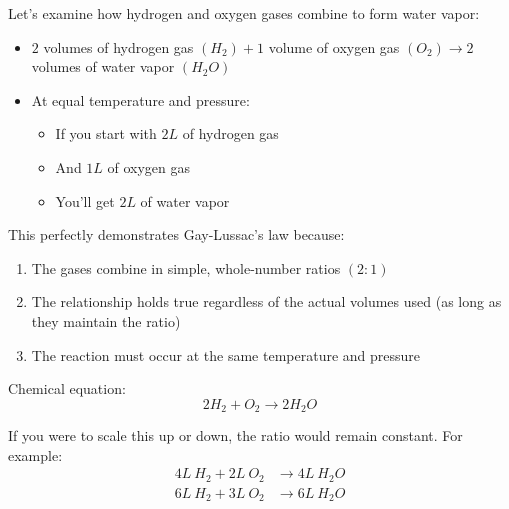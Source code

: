\documentclass[
  a4paper,
]{book}
\providecommand{\tightlist}{%
  \setlength{\itemsep}{0pt}\setlength{\parskip}{0pt}}
\begin{document}
\begin{tcolorbox}[enhanced jigsaw, coltitle=black, title=\textcolor{quarto-callout-note-color}{\faInfo}\hspace{0.5em}{Example: Formation of Water from Hydrogen and Oxygen Gases}, colframe=quarto-callout-note-color-frame, toprule=.15mm, opacitybacktitle=0.6, left=2mm, opacityback=0, breakable, toptitle=1mm, bottomtitle=1mm, leftrule=.75mm, arc=.35mm, titlerule=0mm, colbacktitle=quarto-callout-note-color!10!white, rightrule=.15mm, bottomrule=.15mm, colback=white]

Let's examine how hydrogen and oxygen gases combine to form water vapor:

\begin{itemize}
\tightlist
\item
  \(2\) volumes of hydrogen gas \((H_2) + 1\) volume of oxygen gas
  \((O_2) \rightarrow 2\) volumes of water vapor \((H_2O)\)
\item
  At equal temperature and pressure:

  \begin{itemize}
  \tightlist
  \item
    If you start with \(2L\) of hydrogen gas
  \item
    And \(1L\) of oxygen gas
  \item
    You'll get \(2L\) of water vapor
  \end{itemize}
\end{itemize}

This perfectly demonstrates Gay-Lussac's law because:

\begin{enumerate}
\def\labelenumi{\arabic{enumi}.}
\tightlist
\item
  The gases combine in simple, whole-number ratios \((2:1)\)
\item
  The relationship holds true regardless of the actual volumes used (as
  long as they maintain the ratio)
\item
  The reaction must occur at the same temperature and pressure
\end{enumerate}

Chemical equation: \[2H_2 + O_2 \rightarrow 2H_2O\]

If you were to scale this up or down, the ratio would remain constant.
For example: \[
\begin{aligned}
4L\: H_2 + 2L\: O_2 &\rightarrow 4L\: H_2O \\
6L\: H_2 + 3L\: O_2 &\rightarrow 6L\: H_2O
\end{aligned}
\]

\end{tcolorbox}
\end{document}
